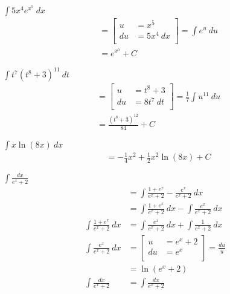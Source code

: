\documentclass[12pt]{article}
\newenvironment{problem}[2][]{
    \begin{trivlist}
        \item[
            {\bfseries #1}
            {\bfseries #2.}
        ]
}{\end{trivlist}}
\newcommand{\subu}[2]{
\left[
\begin{alignedat}{1}
u &= #1 \\
du &= #2 \\
\end{alignedat}
\right] 
}
\begin{document}
\begin{problem}{47}
$\displaystyle\int 5x^4 e^{x^5} ~ dx$
\begin{align}
&= \subu{x^5}{5x^4 ~ dx} = \int e^u ~ du \\
&= e^{x^5} + C
\end{align}
\end{problem}

\begin{problem}{49}
$\displaystyle\int t^7 \left(t^8 + 3\right)^{11} ~ dt$
\begin{align}
&= \subu{t^8 + 3}{8t^7 ~ dt} = \frac{1}{7} \int u^{11} ~ du \\
&= \frac{\left(t^8 + 3\right)^{12}}{84} + C
\end{align}
\end{problem}

\begin{problem}{51}
$\displaystyle\int x \ln \left(8x\right) ~ dx$
\begin{align}
&= - \frac{1}{4} x^2 + \frac{1}{2} x^2 \ln \left(8x\right) + C
\end{align}
\end{problem}

\begin{problem}{53}
$\displaystyle\int \frac{dx}{e^x + 2}$
\begin{align}
&= \int \frac{1 + e^x}{e^x + 2} - \frac{e^x}{e^x + 2} ~ dx \\
&= \int \frac{1 + e^x}{e^x + 2} ~ dx - \int \frac{e^x}{e^x + 2} ~ dx \\
\int \frac{1 + e^x}{e^x + 2} ~ dx &= \int \frac{e^x}{e^x + 2} ~ dx + \int \frac{1}{e^x + 2} ~ dx \\
\int \frac{e^x}{e^x + 2} ~ dx &= \subu{e^x + 2}{e^x} = \frac{du}{u} \\
&= \ln \left(e^x + 2\right) \\
\int \frac{dx}{e^x + 2} &= \int \frac{dx}{e^x + 2}
\end{align}
\end{problem}
\end{document}
